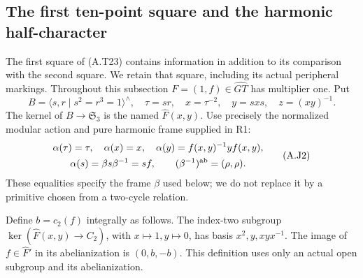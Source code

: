 \subsection{The first ten-point square and the harmonic half-character}

The first square of (A.T23) contains information in addition to
its comparison with the second square.  We retain that square,
including its actual peripheral markings.  Throughout this
subsection $F=(1,f)\in\widehat{GT}$ has multiplier one.  Put
\[
 B=\langle s,r\mid s^2=r^3=1\rangle^{\wedge},\quad
 \tau=sr,\quad x=\tau^{-2},\quad y=sxs,\quad z=(xy)^{-1}.
 \tag{A.J1}
\]
The kernel of $B\to\mathfrak S_3$ is the named
$\widehat F(x,y)$.  Use precisely the normalized modular action
and pure harmonic frame supplied in R1:
\[
 \begin{gathered}
 \alpha(\tau)=\tau,\quad \alpha(x)=x,\quad
 \alpha(y)=f(x,y)^{-1}yf(x,y),\\
 \alpha(s)=\beta s\beta^{-1}=sf,
 \qquad (\beta^{-1})^{\rm ab}=(\rho,\rho).
 \end{gathered}
 \tag{A.J2}
\]
These equalities specify the frame $\beta$ used below; we do not
replace it by a primitive chosen from a two-cycle relation.

Define $b=c_2(f)$ integrally as follows.  The index-two subgroup
$\ker(\widehat F(x,y)\to C_2)$, with $x\mapsto1,y\mapsto0$,
has basis $x^2,y,xyx^{-1}$.  The image of $f\in\widehat F'$ in
its abelianization is $(0,b,-b)$.  This definition uses only an
actual open subgroup and its abelianization.

